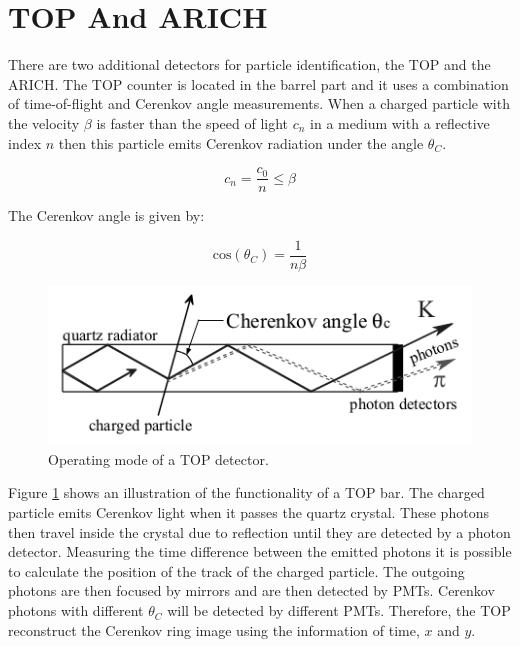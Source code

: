 \documentclass[a4paper,11pt,twosided,final,german,openbib,pdftex,listof=totoc,bibliography=totoc]{scrbook}
\begin{document}
\section{TOP And ARICH}
\label{sec:ARTO}

There are two additional detectors for particle identification, the TOP and the ARICH. The TOP counter is located in the barrel part and it uses a combination of time-of-flight and Cerenkov angle measurements.
When a charged particle with the velocity $\beta$ is faster than the speed of light $c_n$ in a medium  with a reflective index $n$ then this particle emits Cerenkov radiation under the angle $\theta_{C} $.\cite{cerenkovAngle}


\begin{equation}
c_n = \frac{c_0}{n} \leq \beta	
\end{equation}

The Cerenkov angle is given by:\cite{cerenkovAngle}

\begin{equation}
\textrm{cos}(\theta_C)=\frac{1}{n\beta}
\end{equation}

\begin{figure}[h!]
	\centering
	\includegraphics[width=12cm]{Bilder/TOP}
	\caption[TOP Principle]{Operating mode of a TOP detector.\cite{B2TR}}
	\label{fig:TOP}
\end{figure}

Figure \ref{fig:TOP} shows an illustration of the functionality of a TOP bar. The charged particle emits Cerenkov light when it passes the quartz crystal. These photons then travel inside the crystal due to reflection until they are detected by a photon detector. Measuring the time difference between the emitted photons it is possible to calculate the position of the track of the charged particle. The outgoing photons are then focused by mirrors and are then detected by PMTs. Cerenkov photons with different $\theta_C$ will be detected by different PMTs. Therefore, the TOP reconstruct the Cerenkov ring image using the information of time, $x$ and $y$.\cite{B2TR} 
\end{document}

